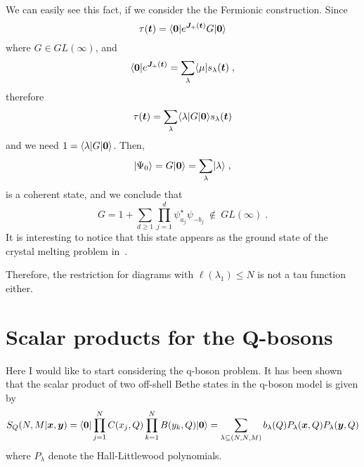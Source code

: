 \documentclass[a4paper,11pt]{amsart}
\begin{document}
We can easily see this fact, if we consider the the Fermionic
construction. Since
\begin{equation}
\tau(\bm{t}) = \langle\bm{0}\rvert e^{\bm{J}_+(\bm{t})} G \lvert\bm{0}\rangle
\end{equation}
where \(G\in GL(\infty)\), and 
\begin{equation}
  \langle\bm{0}\rvert e^{\bm{J}_+(\bm{t})} = \sum_\lambda \langle\mu\rvert s_\lambda(\bm{t})\; , 
\end{equation}
therefore
\begin{equation}
\tau(\bm{t}) = \sum_{\lambda} \langle\lambda\rvert G \lvert\bm{0}\rangle s_\lambda(\bm{t})
\end{equation}
and we need \(1 = \langle\lambda\rvert G \lvert\bm{0}\rangle \). Then, 
\begin{equation}
  \lvert\Psi_0\rangle = G\lvert\bm{0}\rangle = \sum_\lambda \lvert\lambda\rangle\; ,
\end{equation}
is a coherent state, and we conclude that
\begin{equation}
G = 1 +  \sum_{d\geq 1} \prod_{j=1}^d \psi^\star_{a_j} \psi_{-b_j}\ \notin \ GL(\infty) \;. 
\end{equation}
It is interesting to notice that this state appears as the ground
state of the crystal melting problem in~\cite{Dijkgraaf:2008ua}.

Therefore, the restriction for diagrams with \(\ell(\lambda_1) \leq N\) is
not a tau function either.


\section{Scalar products for the Q-bosons}

Here I would like to start considering the q-boson problem. It has
been shown~\cite{Wheeler:2010vmq, Sulkowski:2008mx, Tsilevich:2006}
that the scalar product of two off-shell Bethe states in the q-boson
model is given by
\begin{equation}
S_Q(N,M | \bm{x}, \bm{y}) = \langle\bm{0}\rvert \prod_{j=1}^N C(x_j, Q)
\prod_{k=1}^N B(y_k, Q) \lvert\bm{0}\rangle
= \sum_{\lambda \subseteq
  (N,N,M)} b_\lambda(Q) P_{\lambda}(\bm{x}, Q) P_{\lambda}(\bm{y}, Q)
\end{equation}
where \(P_\lambda\) denote the Hall-Littlewood polynomials.
\end{document}
